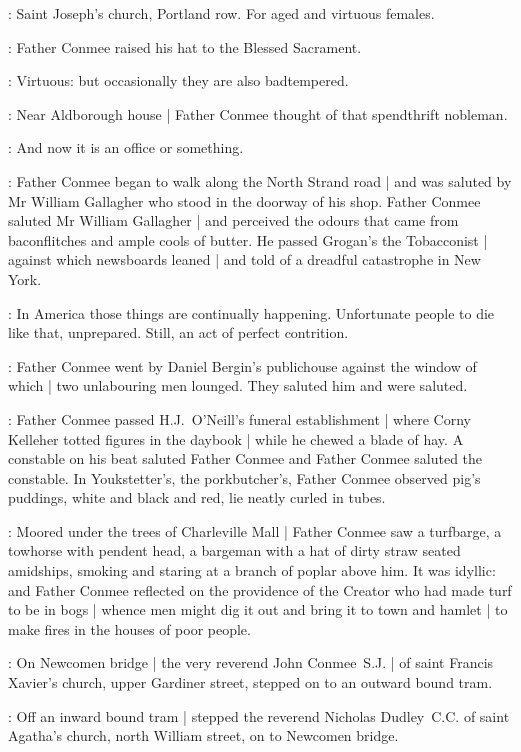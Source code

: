 \conmeeint:
Saint Joseph's church, Portland row.
For aged and virtuous females.

:
Father Conmee raised his hat to the Blessed Sacrament.

\conmeeint:
Virtuous: but occasionally they are also badtempered.

:
Near Aldborough house |
Father Conmee thought of that spendthrift nobleman.

\conmeeint:
And now it is an office or something.

:
Father Conmee began to walk along the North Strand road |
and was saluted by Mr William Gallagher
who stood in the doorway of his shop.
Father Conmee saluted Mr William Gallagher |
and perceived the odours
that came from baconflitches and ample cools of butter.
He passed Grogan's the Tobacconist |
against which newsboards leaned |
and told of a dreadful catastrophe
in New York.

\conmeeint:
In America those things are continually happening.
Unfortunate people to die like that, unprepared.
Still, an act of perfect contrition.

:
Father Conmee went by Daniel Bergin's publichouse
against the window of which |
two unlabouring men lounged.
They saluted him and were saluted.

:
Father Conmee passed H.J.~O'Neill's funeral establishment |
where Corny Kelleher totted figures in the daybook |
while he chewed a blade of hay.
A constable on his beat saluted Father Conmee
and Father Conmee saluted the constable.
In Youkstetter's, the porkbutcher's,
Father Conmee observed pig's puddings,
white and black and red,
lie neatly curled in tubes.

:
Moored under the trees of Charleville Mall |
Father Conmee saw a turfbarge,
a towhorse with pendent head,
a bargeman with a hat of dirty straw seated amidships,
smoking and staring at a branch of poplar above him.
It was idyllic:
and Father Conmee reflected on the providence of the Creator
who had made turf to be in bogs |
whence men might dig it out and bring it to town and hamlet |
to make fires in the houses of poor people.

:
On Newcomen bridge |
the very reverend John Conmee~S.J. |
of saint Francis Xavier's church, upper Gardiner street,
stepped on to an outward bound tram.

:
Off an inward bound tram |
stepped the reverend Nicholas Dudley~C.C.
of saint Agatha's church, north William street,
on to Newcomen bridge.

